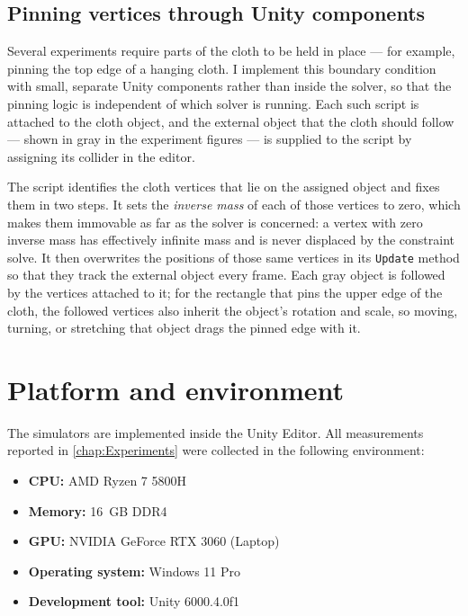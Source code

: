 \subsection{Pinning vertices through Unity components}
\label{ssec:Pinning}
Several experiments require parts of the cloth to be held in place --- for
example, pinning the top edge of a hanging cloth. I implement this boundary
condition with small, separate Unity components rather than inside the solver, so
that the pinning logic is independent of which solver is running. Each such script
is attached to the cloth object, and the external object that the cloth should
follow --- shown in gray in the experiment figures --- is supplied to the script
by assigning its collider in the editor.

The script identifies the cloth vertices that lie on the assigned object and
fixes them in two steps. It sets the \emph{inverse mass} of each of those vertices
to zero, which makes them immovable as far as the solver is concerned: a vertex
with zero inverse mass has effectively infinite mass and is never displaced by the
constraint solve. It then overwrites the positions of those same vertices in its
\texttt{Update} method so that they track the external object every frame. Each gray object is followed by the
vertices attached to it; for the rectangle that pins the upper edge of the cloth,
the followed vertices also inherit the object's rotation and scale, so moving,
turning, or stretching that object drags the pinned edge with it.

\section{Platform and environment}
\label{sec:Platform}
The simulators are implemented inside the Unity Editor. All measurements
reported in \autoref{chap:Experiments} were collected in the following environment:
\begin{itemize}
    \item \textbf{CPU:} AMD Ryzen 7 5800H
    \item \textbf{Memory:} 16~GB DDR4
    \item \textbf{GPU:} NVIDIA GeForce RTX 3060 (Laptop)
    \item \textbf{Operating system:} Windows 11 Pro
    \item \textbf{Development tool:} Unity 6000.4.0f1
\end{itemize}

